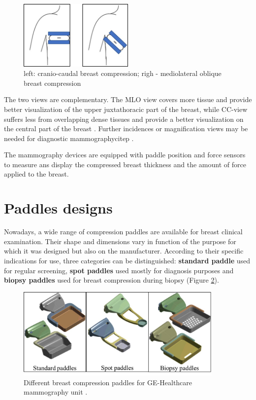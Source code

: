 \begin{figure}[!h]
\centering
\includegraphics[width=0.5\textwidth,keepaspectratio]{figures/cc_mlo_view.jpg} 
\caption{left: cranio-caudal breast compression; righ - mediolateral oblique breast compression }
\label{fig:cc_mlo_view}
\end{figure}

 The two views are complementary. The MLO view covers more tissue and provide better visualization of the upper juxtathoracic part of the breast, while CC-view suffers less from overlapping dense tissues and provide a better visualization on the central part of the breast \citep{chan_image_1987,kim_computer_2006}.  Further incidences or magnification views may be needed for diagnostic mammographycitep \citep{groot_towards_2015}.
 

The mammography devices are equipped with paddle position and force sensors to measure ans display the compressed breast thickness and the amount of force applied to the breast.

\section{Paddles designs} \label{section:compressionpaddlesdesign}

Nowadays, a wide range of compression paddles are available for breast clinical examination. Their shape and dimensions vary in function of the purpose for which it was designed but also on the manufacturer. According to their specific
indications for use, three categories can be distinguished: \textbf{standard paddle} used for regular screening, \textbf{spot paddles} used mostly for diagnosis purposes and \textbf{biopsy paddles} used for breast compression during biopsy (Figure \ref{fig:compressionpaddlestypes}). 


\begin{figure}[!h]
\centering
\includegraphics[width=0.9\textwidth,keepaspectratio]{figures/compressionpaddlestypes.jpg} 
\caption{Different breast compression paddles for GE-Healthcare mammography unit .}\label{fig:compressionpaddlestypes}
\end{figure}
    

